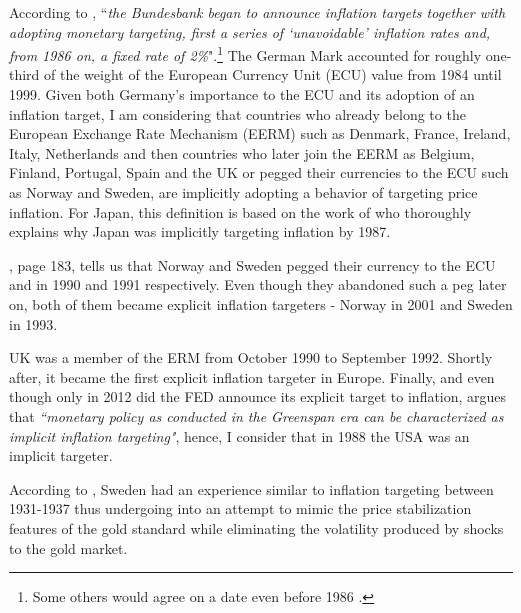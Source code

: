 \documentclass[12pt]{article}
\begin{document}
\begin{appendices}
According to \cite{vonHagen1999}, ``\textit{the Bundesbank began to announce inflation targets together with adopting monetary targeting, first a series of `unavoidable’ inflation rates and, from 1986 on, a fixed rate of 2\%}".\footnote{Some others would agree on a date even before 1986 \citep{Mishkin2001}.} The German Mark accounted for roughly one-third of the weight of the European Currency Unit (ECU) value from 1984 until 1999. Given both Germany's importance to the ECU and its adoption of an inflation target, I am considering that countries who already belong to the European Exchange Rate Mechanism (EERM) such as Denmark, France, Ireland, Italy, Netherlands and then countries who later join the EERM as Belgium, Finland, Portugal, Spain and the UK or pegged their currencies to the ECU such as Norway and Sweden, are implicitly adopting a behavior of targeting price inflation. For Japan, this definition is based on the work of \cite{Jinushi2000} who thoroughly explains why Japan was implicitly targeting inflation by 1987.

\cite{Ungerer1997}, page 183, tells us that Norway and Sweden pegged their currency to the ECU and in 1990 and 1991 respectively. Even though they abandoned such a peg later on, both of them became explicit inflation targeters - Norway in 2001 and Sweden in 1993. 

UK was a member of the ERM from October 1990 to September 1992. Shortly after, it became the first explicit inflation targeter in Europe. Finally, and even though only in 2012 did the FED announce its explicit target to inflation, \cite{Goodfriend2004} argues that \textit{``monetary policy as conducted in the Greenspan era can be characterized as implicit inflation targeting"}, hence, I consider that in 1988 the USA was an implicit targeter.

According to \cite{Berg1999}, Sweden had an experience similar to inflation targeting between 1931-1937 thus undergoing into an attempt to mimic the price stabilization features of the gold standard while eliminating the volatility produced by shocks to the gold market. 





\end{appendices}
\end{document}
